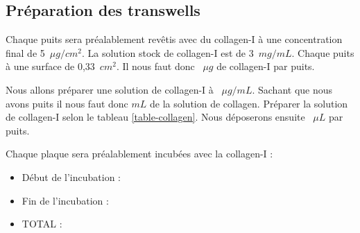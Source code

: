 \subsection{Préparation des transwells}

Chaque puits sera préalablement revêtis avec du collagen-I à une concentration final de 5~$\mu g/cm^2$. La solution stock de collagen-I est de  3~$mg/mL$. Chaque puits à une surface de 0,33~$cm^2$. Il nous faut donc ~$\mu g$ de collagen-I par puits.


Nous allons préparer une solution de collagen-I à ~$\mu g/mL$. Sachant que nous avons  puits il nous faut donc  $mL$ de la solution de collagen. Préparer la solution de collagen-I selon le tableau \ref{table-collagen}. Nous déposerons ensuite ~$\mu L$ par puits.


\begin{table}[H]
\caption{Dilution de la collagen-I}
\label{table-collagen}
\end{table}

Chaque plaque sera préalablement incubées avec la collagen-I : 

\begin{itemize}
\item Début de l'incubation : 
\item Fin de l'incubation : 
\item TOTAL : 
\end{itemize}
